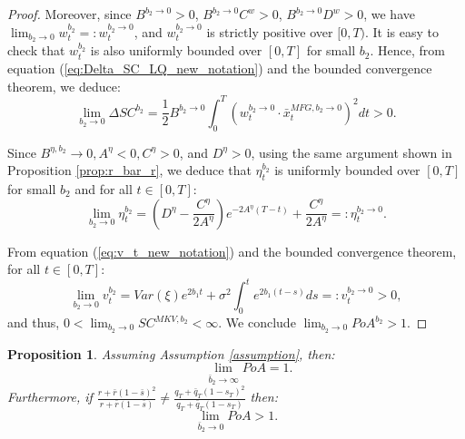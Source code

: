 \documentclass[11pt]{article}
\newtheorem{proposition}{Proposition}
\begin{document}
\begin{proof}
	
	Moreover, since $B^{b_2 \to 0}>0$, $B^{b_2 \to 0}C^w >0$, $B^{b_2\to 0}D^w > 0$, we have $\lim_{b_2 \to 0} w_t^{b_2}=:w_t^{b_2 \to 0}$, and $w_t^{b_2 \to 0}$ is strictly positive over $[0,T)$. It is easy to check that $w_t^{b_2}$ is also uniformly bounded over $[0,T]$ for small $b_2$. Hence, from equation (\ref{eq:Delta_SC_LQ_new_notation}) and the bounded convergence theorem, we deduce:
	\begin{equation*}
	\lim_{b_2 \to 0} \Delta SC^{b_2} = \frac{1}{2} B^{b_2\to 0} \int_0^T (w_t^{b_2 \to 0} \cdot \bar{x}_t^{MFG,b_2 \to 0})^2 dt >0.
	\end{equation*}
	
	
	Since $B^{\eta,b_2} \to 0, A^{\eta} < 0, C^{\eta} >0$, and $D^{\eta} > 0$, using the same argument shown in Proposition \ref{prop:r_bar_r}, 
	we deduce that $\eta_t^{b_2}$ is uniformly bounded over $[0,T]$ for small $b_2$ and for all $t \in[0,T]$:
	$$\lim_{b_2 \to 0}\eta_t^{b_2}=\left(D^{\eta} - \frac{C^{\eta}}{2A^\eta}\right) e^{-2A^\eta(T-t)} + \frac{C^\eta}{2A^{\eta} }=:\eta_t^{b_2 \to 0}.$$
	
	From equation (\ref{eq:v_t_new_notation}) and the bounded convergence theorem, for all $t \in [0,T]$:
	$$ \lim_{b_2 \to 0}v_t^{b_2}=Var(\xi) e^{2b_1 t} + \sigma^2 \int_0^t e^{2b_1 (t-s)} ds=:v_t^{b_2 \to 0}>0,$$
	and thus, $ 0 < \lim_{b_2 \to 0} SC^{MKV,b_2} < \infty.$ We conclude $\lim_{b_2 \to 0} PoA^{b_2} > 1.$
\end{proof}

\begin{proposition}
	Assuming Assumption \ref{assumption}, then:
	$$ \qquad\lim_{\bar{b}_2 \to \infty} PoA = 1.$$
	Furthermore, if	$\frac{r + \bar{r}(1- \bar{s})^2}{r + \bar{r}(1-\bar{s})} \neq \frac{q_T+\bar{q}_T(1-s_T)^2}{q_T+\bar{q}_T(1-s_T)}$ then:
	\begin{equation*}
	\lim_{\bar{b}_2 \to 0} PoA > 1. 
	\end{equation*}	
	\label{prop:b2bar}
\end{proposition}
\end{document}
